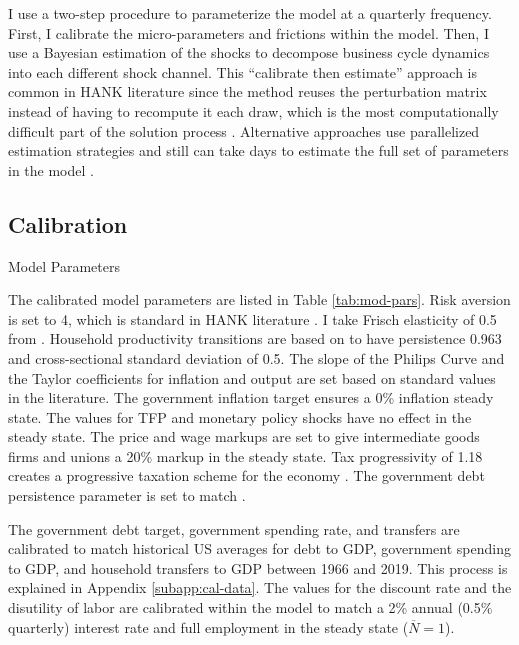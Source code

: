 I use a two-step procedure to parameterize the model at a quarterly frequency. First, I calibrate the micro-parameters and frictions within the model. Then, I use a Bayesian estimation of the shocks to decompose business cycle dynamics into each different shock channel. This ``calibrate then estimate'' approach is common in HANK literature since the method reuses the perturbation matrix instead of having to recompute it each draw, which is the most computationally difficult part of the solution process \autocites{winberry2018method}{auclert2020micro}{auclert2021using}{bayer2024shocks}. Alternative approaches use parallelized estimation strategies and still can take days to estimate the full set of parameters in the model \autocite{acharya2023estimating}.


\subsection{Calibration}

\begin{table}[t!]
    \centering
    \caption{Model Parameters}
    
    \label{tab:mod-pars}
\end{table}

The calibrated model parameters are listed in Table \ref{tab:mod-pars}. Risk aversion is set to 4, which is standard in HANK literature \autocite{kaplan2018monetary}. I take Frisch elasticity of 0.5 from \textcite{chetty2012bounds}. Household productivity transitions are based on \textcite{storesletten2004cyclical} to have persistence 0.963 and cross-sectional standard deviation of 0.5. The slope of the Philips Curve and the Taylor coefficients for inflation and output are set based on standard values in the literature. The government inflation target ensures a 0\% inflation steady state. The values for TFP and monetary policy shocks have no effect in the steady state. The price and wage markups are set to give intermediate goods firms and unions a 20\% markup in the steady state. Tax progressivity of 1.18 creates a progressive taxation scheme for the economy \autocite{heathcote2017optimal}. The government debt persistence parameter is set to match \textcite{auclert2024intertemporal}.

The government debt target, government spending rate, and transfers are calibrated to match historical US averages for debt to GDP, government spending to GDP, and household transfers to GDP between 1966 and 2019. This process is explained in Appendix \ref{subapp:cal-data}. The values for the discount rate and the disutility of labor are calibrated within the model to match a 2\% annual (0.5\% quarterly) interest rate and full employment in the steady state ($\overline{N} = 1$).



